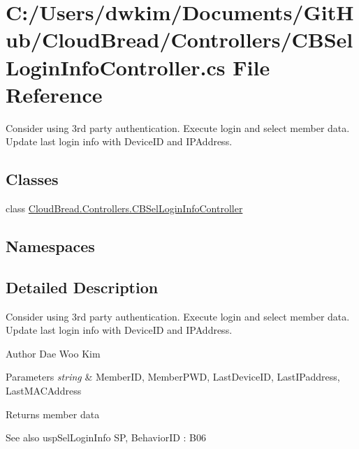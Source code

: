 \hypertarget{a00148}{}\section{C\+:/\+Users/dwkim/\+Documents/\+Git\+Hub/\+Cloud\+Bread/\+Controllers/\+C\+B\+Sel\+Login\+Info\+Controller.cs File Reference}
\label{a00148}


Consider using 3rd party authentication. Execute login and select member data. ~\newline
Update last login info with Device\+ID and I\+P\+Address.  


\subsection*{Classes}
\begin{DoxyCompactItemize}
\item 
class \hyperlink{a00036}{Cloud\+Bread.\+Controllers.\+C\+B\+Sel\+Login\+Info\+Controller}
\end{DoxyCompactItemize}
\subsection*{Namespaces}
\begin{DoxyCompactItemize}
\end{DoxyCompactItemize}


\subsection{Detailed Description}
Consider using 3rd party authentication. Execute login and select member data. ~\newline
Update last login info with Device\+ID and I\+P\+Address. 

\begin{DoxyAuthor}{Author}
Dae Woo Kim 
\end{DoxyAuthor}

\begin{DoxyParams}{Parameters}
{\em string} & Member\+ID, Member\+P\+WD, Last\+Device\+ID, Last\+I\+Paddress, Last\+M\+A\+C\+Address \\
\hline
\end{DoxyParams}
\begin{DoxyReturn}{Returns}
member data 
\end{DoxyReturn}
\begin{DoxySeeAlso}{See also}
usp\+Sel\+Login\+Info SP, Behavior\+ID \+: B06 
\end{DoxySeeAlso}
